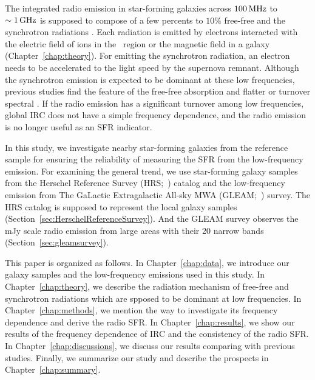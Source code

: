 The integrated radio emission in star-forming galaxies across $100\,\mathrm{MHz}$ to $\sim 1\,\mathrm{GHz}$ is supposed to compose of a few percents to $10\%$ free-free and the synchrotron radiations \citep{Condon1992a}.
Each radiation is emitted by electrons interacted with the electric field of ions in the \ih~region or the magnetic field in a galaxy (Chapter~\ref{chap:theory}).
For emitting the synchrotron radiation, an electron needs to be accelerated to the light speed by the supernova remnant.
Although the synchrotron emission is expected to be dominant at these low frequencies, previous studies find the feature of the free-free absorption and flatter or turnover spectral \citep{Schober2017, Chyzy2018}.
If the radio emission has a significant turnover among low frequencies, global IRC does not have a simple frequency dependence, and the radio emission is no longer useful as an SFR indicator.

In this study, we investigate nearby star-forming galaxies from the reference sample for ensuring the reliability of measuring the SFR from the low-frequency emission.
For examining the general trend, we use star-forming galaxy samples from the Herschel Reference Survey (HRS;~\citealt{Boselli2010}) catalog and the low-frequency emission from The GaLactic Extragalactic All-sky MWA (GLEAM;~\citealt{Hurley-Walker2017a}) survey.
The HRS catalog is supposed to represent the local galaxy samples (Section~\ref{sec:HerschelReferenceSurvey}).
And the GLEAM survey observes the mJy scale radio emission from large areas with their 20 narrow bands (Section~\ref{sec:gleamsurvey}).

This paper is organized as follows.
In Chapter~\ref{chap:data}, we introduce our galaxy samples and the low-frequency emissions used in this study.
In Chapter~\ref{chap:theory}, we describe the radiation mechanism of free-free and synchrotron radiations which are spposed to be dominant at low frequencies.
In Chapter~\ref{chap:methods}, we mention the way to investigate its frequency dependence and derive the radio SFR\@.
In Chapter~\ref{chap:results}, we show our results of the frequency dependence of IRC and the consistency of the radio SFR\@.
In Chapter~\ref{chap:discussions}, we discuss our results comparing with previous studies.
Finally, we summarize our study and describe the prospects in Chapter~\ref{chap:summary}.



